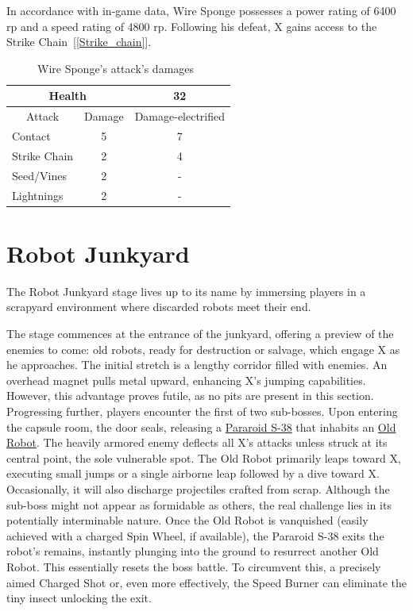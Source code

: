 In accordance with in-game data, Wire Sponge possesses a power rating of 6400 rp and a speed rating of 4800 rp. Following his defeat, X gains access to the Strike Chain~[\ref{Strike_chain}].

\begin{table}[htp]
	\centering
	\begin{tabular}[h]{l c c}
		
		\toprule
		\multicolumn{2}{c}{Health}  & 32\\
		\midrule
		\multicolumn{1}{c}{Attack} & \multicolumn{1}{c}{Damage}& \multicolumn{1}{c}{Damage-electrified}\\
		Contact & 5 & 7\\
		Strike Chain & 2 & 4\\
		Seed/Vines& 2&-\\
		Lightnings & 2&-\\
		\bottomrule
	\end{tabular}
	\caption{Wire Sponge's attack's damages~\cite{wiki:wire_sponge}}
\end{table}

\section{Robot Junkyard}
The Robot Junkyard stage lives up to its name by immersing players in a scrapyard environment where discarded robots meet their end.

The stage commences at the entrance of the junkyard, offering a preview of the enemies to come: old robots, ready for destruction or salvage, which engage X as he approaches. The initial stretch is a lengthy corridor filled with enemies. An overhead magnet pulls metal upward, enhancing X's jumping capabilities. However, this advantage proves futile, as no pits are present in this section. Progressing further, players encounter the first of two sub-bosses. Upon entering the capsule room, the door seals, releasing a \hyperlink{miniboss:Pararoid_S-38}{Pararoid S-38} that inhabits an \hyperlink{miniboss:Old_robot}{Old Robot}. The heavily armored enemy deflects all X's attacks unless struck at its central point, the sole vulnerable spot. The Old Robot primarily leaps toward X, executing small jumps or a single airborne leap followed by a dive toward X. Occasionally, it will also discharge projectiles crafted from scrap. Although the sub-boss might not appear as formidable as others, the real challenge lies in its potentially interminable nature. Once the Old Robot is vanquished (easily achieved with a charged Spin Wheel, if available), the Pararoid S-38 exits the robot's remains, instantly plunging into the ground to resurrect another Old Robot. This essentially resets the boss battle. To circumvent this, a precisely aimed Charged Shot or, even more effectively, the Speed Burner can eliminate the tiny insect unlocking the exit.

